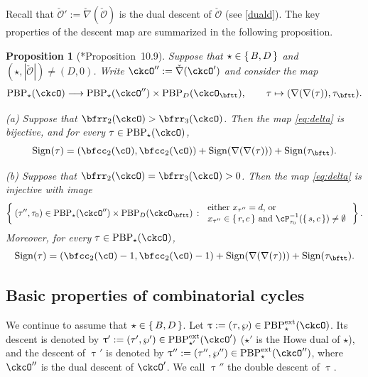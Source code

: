 \documentclass[11pt,a4paper]{amsart}
\def\abs#1{\left|{#1}\right|}
\newcommand{\CO}{{\mathcal {O}}}
\def\DD{\nabla}
\numberwithin{equation}{section}
\newtheorem{prop}[thm]{Proposition}
\theoremstyle{remark}
\def\ssign{\mathrm{Sign}}
\def\PBPes{\mathrm{PBP}^{\mathrm{ext}}_{\star}}
\def\ckcOpp{\ckcO^{\prime\prime}}
\def\ckDD{{\check\DD}}
\def\PBP{\mathrm{PBP}}
\begin{document}
Recall that $\check \CO':=\check \nabla(\check \CO)$ is the dual descent of $\check \CO$ (see \eqref{duald}).  The key properties of the descent map 
are summarized in the following proposition.


\begin{prop}[{\cite{BMSZa}*{Proposition~10.9}}]
\label{lem:delta}
Suppose that $\star \in \set{B,D}$ and $(\star, \abs{\check \CO})\neq (D, 0)$. Write $\ckcOpp := \ckDD(\ckcO')$ and consider the map
\begin{equation}\label{eq:delta}
   \PBP_\star(\ckcO)\longrightarrow
    \PBP_\star(\ckcOpp)\times \PBP_{D}(\ckcO_\bftt),
    \qquad \tau \mapsto (\nabla(\nabla(\tau)),\tau_\bftt).
\end{equation}

\noindent (a) Suppose that
$\bfrr_2(\ckcO)>\bfrr_3(\ckcO)$. Then the map \eqref{eq:delta} is bijective, and for every $\tau\in  \PBP_\star(\ckcO) $,
\begin{equation}\label{eq:sign.D}
\ssign(\tau)
=(\bfcc_2(\cO),\bfcc_2(\cO))+\ssign(\nabla(\nabla(\tau)))+\ssign(\tau_\bftt).
\end{equation}

\noindent (b)  Suppose that  $\bfrr_2(\ckcO)=\bfrr_3(\ckcO)>0$.
Then the map \eqref{eq:delta} is injective with image 
\begin{equation}\label{eq:delta.I}
    \Set{ (\tau'',\tau_0)  \in \PBP_\star(\ckcOpp)\times \PBP_D(\ckcO_\bftt)  \,:\,
    \begin{array}{l}
        \text{either
    $x_{\tau''} = d$, or} \\
    \text{$x_{\tau''}\in \set{r,c}$  and
    $\cP_{\tau_0}^{-1}(\set{s,c})\neq \emptyset$}
    \end{array}
}.
\end{equation}
Moreover,  for every $\tau\in  \PBP_\star(\ckcO) $,
\begin{equation}\label{eq:sign.GD}
\ssign(\tau)
=(\bfcc_2(\cO)-1,\bfcc_2(\cO)-1)+\ssign(\nabla(\nabla(\tau)))+\ssign(\tau_\bftt).
\end{equation}
\end{prop}


\subsection{Basic properties of combinatorial cycles}


We continue to assume that $\star\in \set{B,D}$. 
Let $\uptau:=(\tau, \wp)\in \PBPes(\ckcO)$. Its  descent is denoted by $\uptau':=(\tau', \wp')\in \PBP_{\star'}^{\textrm{ext}}(\ckcO')$ ($\star'$ is the Howe dual of $\star$), and the descent of $\uptau'$ is denoted by $\uptau'':=(\tau'', \wp'')\in \PBPes(\ckcO'')$, where $\ckcO''$ is the dual descent of $\ckcO'$. We call $\uptau''$ the double descent of $\uptau$. 
\end{document}

